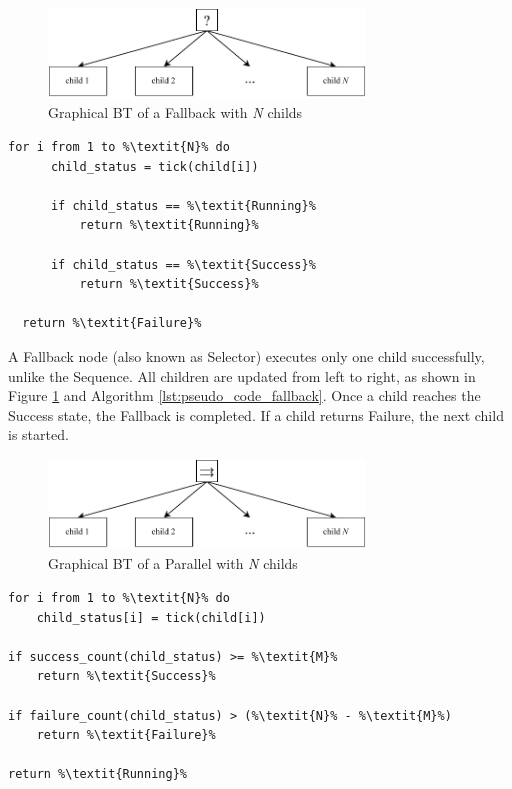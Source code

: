 \begin{figure}[h]
    \centering
    \includegraphics[width=0.75\textwidth]{figures/02_state_of_the_art/fallback.pdf}
    \caption{Graphical BT of a Fallback with \textit{N} childs}
    \label{fig:fallback}
  \end{figure}
  
  \begin{lstlisting}[float=h]
  for i from 1 to %\textit{N}% do
      child_status = tick(child[i])
      
      if child_status == %\textit{Running}%
          return %\textit{Running}%
          
      if child_status == %\textit{Success}%
          return %\textit{Success}%
  
  return %\textit{Failure}%
  \end{lstlisting}

  A Fallback node (also known as Selector) executes only one child successfully, unlike the Sequence. All children are updated from left to right, as shown in Figure \ref{fig:fallback} and Algorithm \ref{lst:pseudo_code_fallback}. Once a child reaches the Success state, the Fallback is completed. If a child returns Failure, the next child is started.

\begin{figure}[h]
    \centering
    \includegraphics[width=0.75\textwidth]{figures/02_state_of_the_art/parallel.pdf}
    \caption{Graphical BT of a Parallel with \textit{N} childs}
    \label{fig:parallel}
\end{figure}
  
\begin{lstlisting}[float=h]
for i from 1 to %\textit{N}% do
    child_status[i] = tick(child[i])
    
if success_count(child_status) >= %\textit{M}%
    return %\textit{Success}%
        
if failure_count(child_status) > (%\textit{N}% - %\textit{M}%)
    return %\textit{Failure}%

return %\textit{Running}%
\end{lstlisting}

